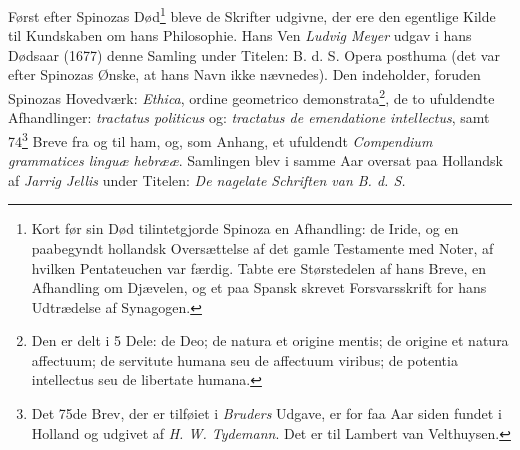 \documentclass[12pt,a4paper]{book}
\begin{document}
Først efter Spinozas Død\footnote{Kort før sin Død tilintetgjorde Spinoza
en Afhandling: de Iride, og en paabegyndt hollandsk Oversættelse af det
gamle Testamente med Noter, af hvilken Pentateuchen var færdig. Tabte ere
Størstedelen af hans Breve, en Afhandling om Djævelen, og et paa Spansk
skrevet Forsvarsskrift for hans Udtrædelse af Synagogen.} bleve de
Skrifter udgivne, der ere den egentlige Kilde til Kundskaben om hans
Philosophie. Hans Ven \emph{Ludvig Meyer} udgav i hans Dødsaar (1677)
denne Samling under Titelen: B. d. S. Opera posthuma (det var efter
Spinozas Ønske, at hans Navn ikke nævnedes). Den indeholder, foruden
Spinozas Hovedværk: \emph{Ethica}, ordine geometrico
demonstrata\footnote{Den er delt i 5 Dele: de Deo; de natura et origine
mentis; de origine et natura affectuum; de servitute humana seu de
affectuum viribus; de potentia intellectus seu de libertate humana.}, de
to ufuldendte Afhandlinger: \emph{tractatus politicus} og: \emph{tractatus
de emendatione intellectus}, samt 74\footnote{Det 75de Brev, der er
tilføiet i \emph{Bruders} Udgave, er for faa Aar siden fundet i Holland og
udgivet af \emph{H. W. Tydemann}. Det er til Lambert van Velthuysen.}
Breve fra og til ham, og, som Anhang, et ufuldendt \emph{Compendium
grammatices linguæ hebrææ}. Samlingen blev i samme Aar oversat paa
Hollandsk af \emph{Jarrig Jellis} under Titelen: \emph{De nagelate
Schriften van B. d. S.}
\end{document}
